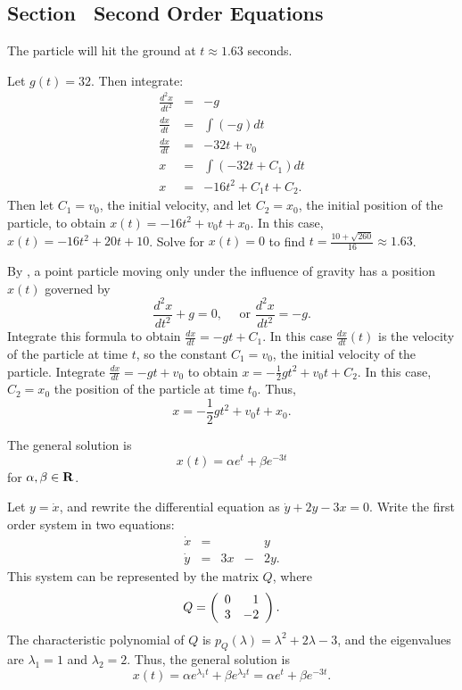 \subsection*{Section~\protect{\ref{S:SOE}} Second Order Equations}

\ans The particle will hit the ground at $t \approx 1.63$ seconds.

\soln Let $g(t) = 32$.  Then integrate:
\[
\begin{array}{rcl}
\frac{d^2x}{dt^2} & = & -g \\
\frac{dx}{dt} & = & \int (-g)dt \\
\frac{dx}{dt} & = & -32t + v_0 \\
x & = & \int (-32t + C_1)dt \\
x & = & -16t^2 + C_1t + C_2.
\end{array}
\]
Then let $C_1 = v_0$, the initial velocity, and let $C_2 = x_0$, the initial
position of the particle, to obtain $x(t) = -16t^2 + v_0t + x_0$.  In this
case, $x(t) = -16t^2 + 20t + 10$.  Solve for $x(t) = 0$ to find
$t = \frac{10 + \sqrt{260}}{16} \approx 1.63$.

By , a point particle moving only under the influence of
gravity has a position $x(t)$ governed by
\[
\frac{d^2x}{dt^2} + g = 0, \quad \mbox{ or } \frac{d^2x}{dt^2} = -g.
\]
Integrate this formula to obtain $\frac{dx}{dt} = -gt + C_1$.  In this case
$\frac{dx}{dt}(t)$ is the velocity of the particle at time $t$, so the
constant $C_1 = v_0$, the initial velocity of the particle.  Integrate
$\frac{dx}{dt} = -gt + v_0$ to obtain
$x = -\frac{1}{2}gt^2 + v_0t + C_2$.  In this case, $C_2 = x_0$ the position
of the particle at time $t_0$.  Thus,
\[
x = -\frac{1}{2}gt^2 + v_0t + x_0.
\]

\ans The general solution is
\[
x(t) = \alpha e^t + \beta e^{-3t}
\]
for $\alpha, \beta \in \mbox{$\bf{R}$}$.

\soln Let $y = \dot{x}$, and rewrite the differential equation as
$\dot{y} + 2y - 3x = 0$.  Write the first order system in two equations:
\[
\begin{array}{rrrrr}
\dot{x} & = & & & y \\
\dot{y} & = & 3x & - & 2y.
\end{array}
\]
This system can be represented by the matrix $Q$, where
\[
Q = \left(\begin{array}{rr} 0 & 1\\ 3 &-2\end{array}\right).
\]
The characteristic polynomial of $Q$ is $p_Q(\lambda) = \lambda^2
+ 2\lambda - 3$, and the eigenvalues are $\lambda_1 = 1$ and
$\lambda_2 = 2$.  Thus, the general solution is
\[
x(t) = \alpha e^{\lambda_1t} + \beta e^{\lambda_2t} =
\alpha e^t + \beta e^{-3t}.
\]

